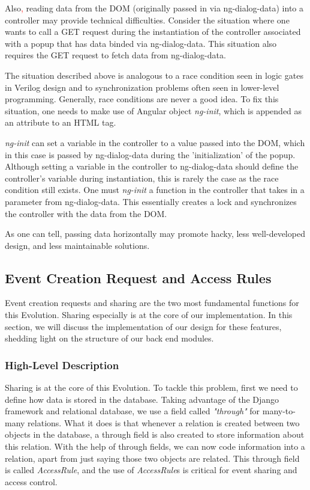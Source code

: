 \documentclass[a4paper]{article}
\newcommand{\comment}[1]{\textcolor{red}{#1}}
\begin{document}
Also\comment{,} reading data from the DOM (originally passed in via ng-dialog-data) into a controller may provide technical difficulties. Consider the situation where one wants to call a GET request during the instantiation of the controller associated with a popup that has data binded via ng-dialog-data. This situation also requires the GET request to fetch data from ng-dialog-data.

The situation described above is analogous to a race condition seen in logic gates in Verilog design and to synchronization problems often seen in lower-level programming. Generally, race conditions are never a good idea. To fix this situation, one needs to make use of Angular object \textit{ng-init}, which is appended as an attribute to an HTML tag. 

\textit{ng-init} can set a variable in the controller to a value passed into the DOM, which in this case is passed by ng-dialog-data during the 'initialization' of the popup. Although setting a variable in the controller to ng-dialog-data should define the controller's variable during instantiation, this is rarely the case as the race condition still exists. One must \textit{ng-init} a function in the controller that takes in a parameter from ng-dialog-data. This essentially creates a lock and synchronizes the controller with the data from the DOM.

As one can tell, passing data horizontally may promote hacky, less well-developed design, and less maintainable solutions.

\subsection{Event Creation Request and Access Rules}
Event creation requests and sharing are the two most fundamental functions for this Evolution. Sharing especially is at the core of our implementation. In this section, we will discuss the implementation of our design for these features, shedding light on the structure of our back end modules.

\subsubsection{High-Level Description}
Sharing is at the core of this Evolution. To tackle this problem, first we need to define how data is stored in the database. Taking advantage of the Django framework and relational database, we use a field called \emph{"through"} for many-to-many relations. What it does is that whenever a relation is created between two objects in the database, a through field is also created to store information about this relation. With the help of through fields, we can now code information into a relation, apart from just saying those two objects are related. This through field is called \emph{AccessRule}, and the use of \emph{AccessRule}s is critical for event sharing and access control.
\end{document}
